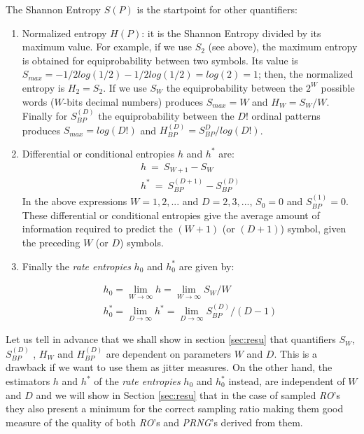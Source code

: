 The Shannon Entropy $S(P)$ is the startpoint for other quantifiers:
\begin{enumerate}
\item Normalized entropy $H(P)$: it is the Shannon Entropy divided by its maximum value. For example, if we use $S_2$ (see above), the maximum entropy is obtained for equiprobability between two symbols. Its value is $S_{max}=-1/2 log(1/2)-1/2 log(1/2)=log(2)=1$; then, the normalized entropy is $H_2=S_2$. If we use $S_W$ the equiprobability between the $2^W$ possible words ($W$-bits decimal numbers) produces $S_{max}=W$ and $H_W=S_W/W$. Finally for $S^{(D)}_{BP}$ the equiprobability between the $D!$ ordinal patterns produces $S_{max}= log(D!)$ and $H^{(D)}_{BP}=S^D_{BP}/log(D!)$.
\item Differential or conditional entropies $h$ and $h^*$ are:
\begin{eqnarray}
h~=~S_{W+1}-S_W\\
h^*~=~S_{BP}^{(D+1)}-S_{BP}^{(D)}
\end{eqnarray}
In the above expressions $W=1,2,...$ and $D=2,3,...$, $S_0=0$ and $S_{BP}^{(1)}=0$. These differential or conditional entropies give the average amount of information required to predict the $(W+1)$ (or $(D+1)$) symbol, given the preceding $W$ (or $D$) symbols.
\item Finally the \emph{rate entropies} $h_0$ and $h_0^*$ are given by:

\begin{eqnarray}
h_0=\lim\limits_{W\rightarrow \infty} h=\lim\limits_{W\rightarrow \infty}{S_{W}/W }\\
h^*_0= \lim\limits_{D\rightarrow \infty} h^*=\lim\limits_{D\rightarrow \infty}{S^{(D)}_{BP}/(D-1)}
\end{eqnarray}

\end{enumerate}

Let us tell in advance that we shall show in section \ref{sec:resu} that quantifiers $S_W$, $S^{(D)}_{BP}$ , $H_W$ and $H^{(D)}_{BP}$ are dependent on parameters $W$ and $D$. This is a drawback if we want to use them as jitter measures. On the other hand, the estimators $h$ and $h^*$ of the \emph{rate entropies} $h_0$ and $h^*_0$ \cite{Ebeling2001,Amigo2005} instead, are independent of $W$ and $D$ and we will show in Section \ref{sec:resu} that in the case of sampled \emph{RO}'s they also present a minimum for the correct sampling ratio making them good measure of the quality of both \emph{RO}'s and \emph{PRNG}'s derived from them. 

